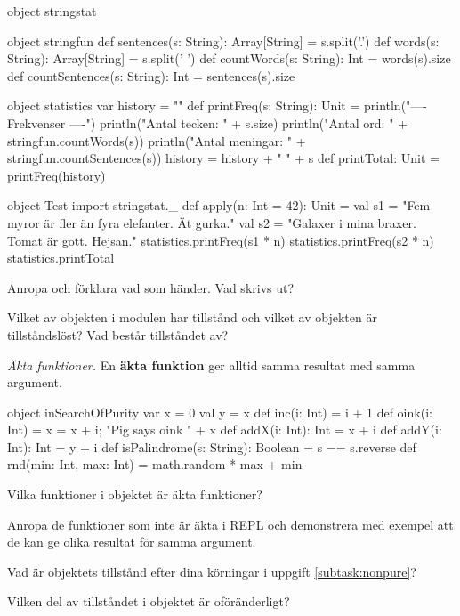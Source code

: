 \begin{Code}
object stringstat {
  object stringfun {
    def sentences(s: String): Array[String] = s.split('.')
    def words(s: String): Array[String] = s.split(' ')
    def countWords(s: String): Int = words(s).size
    def countSentences(s: String): Int = sentences(s).size
  }
  
  object statistics {
    var history = ""
    def printFreq(s: String): Unit = {
      println("\n---- Frekvenser ----")
      println("Antal tecken:   " + s.size)
      println("Antal ord:      " + stringfun.countWords(s))
      println("Antal meningar: " + stringfun.countSentences(s))
      history = history + " " + s
    }
    def printTotal: Unit = printFreq(history)
  }
}
  
object Test {
  import stringstat._
  def apply(n: Int = 42): Unit = {
    val s1 = "Fem myror är fler än fyra elefanter. Ät gurka."
    val s2 = "Galaxer i mina braxer. Tomat är gott. Hejsan."
    statistics.printFreq(s1 * n)
    statistics.printFreq(s2 * n)
    statistics.printTotal
  }
}
\end{Code}

\Subtask Anropa  och förklara vad som händer. Vad skrivs ut?

\Subtask Vilket av objekten i modulen  har tillstånd och vilket av objekten är tillståndslöst? Vad består tillståndet av?


\Task \emph{Äkta funktioner.} En \textbf{äkta funktion} ger alltid samma resultat med samma argument.  

\begin{Code}
object inSearchOfPurity {
  var x = 0
  val y = x
  def inc(i: Int) = i + 1
  def oink(i: Int) = {x = x + i; "Pig says oink " + x}
  def addX(i: Int): Int = x + i
  def addY(i: Int): Int = y + i
  def isPalindrome(s: String): Boolean = s == s.reverse
  def rnd(min: Int, max: Int) = math.random * max + min
}
\end{Code}

\Subtask\Pen Vilka funktioner i objektet  är äkta funktioner?

\Subtask \label{subtask:nonpure} Anropa de funktioner som inte är äkta i REPL och demonstrera med exempel att de kan ge olika resultat för samma argument.

\Subtask Vad är objektets tillstånd efter dina körningar i uppgift \ref{subtask:nonpure}? 

\Subtask Vilken del av tillståndet i objektet är oföränderligt?



